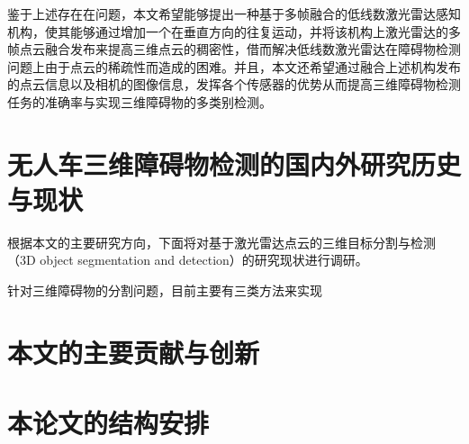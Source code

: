 鉴于上述存在在问题，本文希望能够提出一种基于多帧融合的低线数激光雷达感知机构，使其能够通过增加一个在垂直方向的往复运动，并将该机构上激光雷达的多帧点云融合发布来提高三维点云的稠密性，借而解决低线数激光雷达在障碍物检测问题上由于点云的稀疏性而造成的困难。并且，本文还希望通过融合上述机构发布的点云信息以及相机的图像信息，发挥各个传感器的优势从而提高三维障碍物检测任务的准确率与实现三维障碍物的多类别检测。

\section{无人车三维障碍物检测的国内外研究历史与现状}
根据本文的主要研究方向，下面将对基于激光雷达点云的三维目标分割与检测（3D object segmentation and detection）的研究现状进行调研。

针对三维障碍物的分割问题，目前主要有三类方法来实现

\section{本文的主要贡献与创新}

\section{本论文的结构安排}
